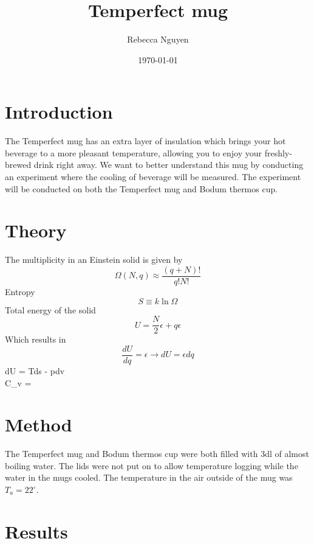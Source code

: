 \documentclass[reprint,english,notitlepage]{revtex4-2}
\begin{document}
\title{Temperfect mug}   %
\author{Rebecca Nguyen}               %
\date{\today}                             %
\noaffiliation
\maketitle                                %


\section{Introduction}
The Temperfect mug has an extra layer of insulation which brings your hot beverage
to a more pleasant temperature, allowing you to enjoy your freshly-brewed drink right away.
We want to better understand this mug by conducting an experiment where the
cooling of beverage will be measured. The experiment will be conducted on both the Temperfect mug and Bodum thermos cup.

\section{Theory}
The multiplicity in an Einstein solid is given by
\begin{equation}
  \Omega(N, q) \approx \frac{(q+N)!}{q!N!}
\end{equation}
Entropy
\begin{equation}
  S \equiv k \ln\Omega
\end{equation}
Total energy of the solid
\begin{equation}
  U = \frac{N}{2}\epsilon + q\epsilon
\end{equation}
Which results in
\begin{equation}
  \frac{dU}{dq} = \epsilon \rightarrow dU = \epsilon dq
\end{equation}
dU = Tds - pdv \\
C_v = 

\section{Method}
The Temperfect mug and Bodum thermos cup were both filled with 3dl of almost boiling water. The lids were not put on to allow temperature logging while the water in the mugs cooled. The temperature in the air outside of the mug was $T_a = 22^{\circ}$.

\section{Results}
\end{document}
